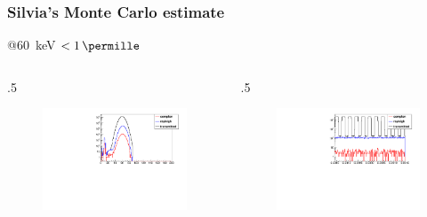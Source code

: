 \documentclass[first,firstsupp]{ETHclass}
\begin{document}
    \begin{frame}
        \frametitle{Silvia's Monte Carlo estimate}
            @\SI{60}{\kilo\electronvolt} $< \SI{1}{\permille}$
        \begin{columns}
            \begin{column}
                {.5\textwidth}
                \begin{figure}[h]
                    \centering
                    \includegraphics[width=\textwidth]{energy}
                \end{figure}
            \end{column}
            \begin{column}
                {.5\textwidth}
                \begin{figure}[h]
                    \centering
                    \includegraphics[width=\textwidth]{position}
                \end{figure}
            \end{column}
        \end{columns}
    \end{frame}
\end{document}
